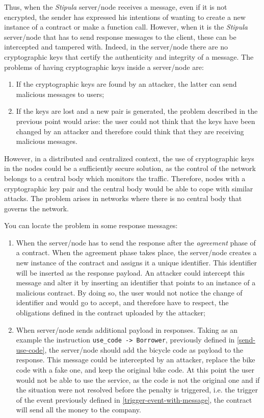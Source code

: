 Thus, when the \textit{Stipula} server/node receives a message, even if it is not encrypted, the sender has 
expressed his intentions of wanting to create a new instance of a contract or make a function call. However, 
when it is the \textit{Stipula} server/node that has to send response messages to the client, these can be 
intercepted and tampered with. Indeed, in the server/node there are no cryptographic keys that certify the 
authenticity and integrity of a message. The problems of having cryptographic keys inside a server/node are:
\begin{enumerate}
   \item If the cryptographic keys are found by an attacker, the latter can send malicious messages to users;
   \item If the keys are lost and a new pair is generated, the problem described in the previous point would 
   arise: the user could not think that the keys have been changed by an attacker and therefore could think 
   that they are receiving malicious messages.
\end{enumerate}

However, in a distributed and centralized context, the use of cryptographic keys in the nodes could be a 
sufficiently secure solution, as the control of the network belongs to a central body which monitors the 
traffic. Therefore, nodes with a cryptographic key pair and the central body would be able to cope with 
similar attacks. The problem arises in networks where there is no central body that governs the network.

You can locate the problem in some response messages:
\begin{enumerate}
   \item When the server/node has to send the response after the \textit{agreement} phase of a contract. 
   When the agreement phase takes place, the server/node creates a new instance of the contract and assigns 
   it a unique identifier. This identifier will be inserted as the response payload. An attacker could 
   intercept this message and alter it by inserting an identifier that points to an instance of a malicious 
   contract. By doing so, the user would not notice the change of identifier and would go to accept, and 
   therefore have to respect, the obligations defined in the contract uploaded by the attacker;
   \item When server/node sends additional payload in responses. Taking as an example the instruction 
   \verb|use_code -> Borrower|, previously defined in \ref{send-use-code}, the server/node should add the 
   bicycle code as payload to the response. This message could be intercepted by an attacker, replace the 
   bike code with a fake one, and keep the original bike code. At this point the user would not be able to 
   use the service, as the code is not the original one and if the situation were not resolved before the 
   penalty is triggered, i.e. the trigger of the event previously defined in 
   \ref{trigger-event-with-message}, the contract will send all the money to the company.
\end{enumerate}

